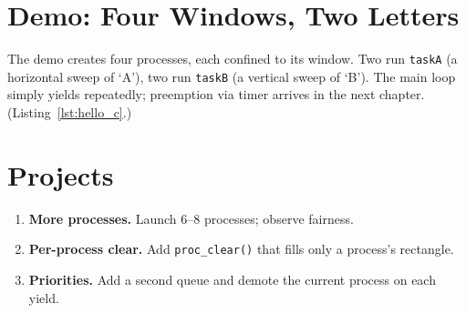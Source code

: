 \begin{figure}[H]
\centering

\end{figure}

\section{Demo: Four Windows, Two Letters}

The demo creates four processes, each confined to its window. Two run
\texttt{taskA} (a horizontal sweep of ‘A’), two run \texttt{taskB} (a vertical
sweep of ‘B’). The main loop simply yields repeatedly; preemption via timer
arrives in the next chapter. (Listing~\ref{lst:hello_c}.)

\begin{figure}[H]
\centering

\end{figure}

\section*{Projects}

\begin{enumerate}
  \item \textbf{More processes.} Launch 6–8 processes; observe fairness.
  \item \textbf{Per-process clear.} Add \texttt{proc\_clear()} that fills only a process’s rectangle.
  \item \textbf{Priorities.} Add a second queue and demote the current process on each yield.
\end{enumerate}

